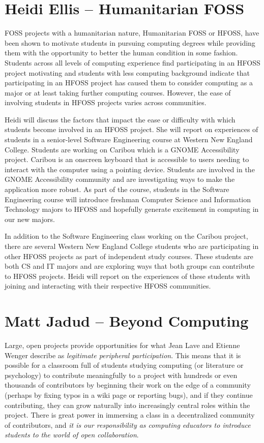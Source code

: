 \documentclass{sig-alternate}
\begin{document}
\section{Heidi Ellis -- Humanitarian FOSS}
FOSS projects with a humanitarian nature, Humanitarian FOSS or HFOSS, have been shown to motivate students in pursuing computing degrees while providing them with the opportunity to better the human condition in some fashion\cite{1536635}. Students across all levels of computing experience find participating in an HFOSS project motivating and students with less computing background indicate that participating in an HFOSS project has caused them to consider computing as a major or at least taking further computing courses\cite{1562959}. However, the ease of involving students in HFOSS projects varies across communities. 

Heidi will discuss the factors that impact the ease or difficulty with which students become involved in an HFOSS project. She will report on experiences of students in a senior-level Software Engineering course at Western New England College. Students are working on Caribou which is a GNOME Accessibility project. Caribou is an onscreen keyboard that is accessible to users needing to interact with the computer using a pointing device. Students are involved in the GNOME Accessibility community and are investigating ways to make the application more robust. As part of the course, students in the Software Engineering course will introduce freshman Computer Science and Information Technology majors to HFOSS and hopefully generate excitement in computing in our new majors.

In addition to the Software Engineering class working on the Caribou project, there are several Western New England College students who are participating in other HFOSS projects as part of independent study courses. These students are both CS and IT majors and are exploring ways that both groups can contribute to HFOSS projects. Heidi will report on the experiences of these students with joining and interacting with their respective HFOSS communities.  

\section{Matt Jadud -- Beyond Computing}%

Large, open projects provide opportunities for what Jean Lave and Etienne Wenger describe as {\em legitimate peripheral participation}. This means that it is possible for a classroom full of students studying computing (or literature or psychology) to contribute meaningfully to a project with hundreds or even thousands of contributors by beginning their work on the edge of a community (perhaps by fixing typos in a wiki page or reporting bugs), and if they continue contributing, they can grow naturally into increasingly central roles within the project. There is great power in immersing a class in a decentralized community of contributors, and {\em it is our responsibility as computing educators to introduce students to the world of open collaboration}.
\end{document}
